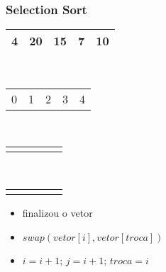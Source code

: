 \documentclass{beamer}
\begin{document}
\begin{frame}
    \frametitle{Selection Sort}
    \begin{center}
        \begin{table}
            \begin{tabular}{| p{0.25cm} | p{0.25cm} | p{0.25cm} | p{0.25cm} | p{0.25cm} |}
                \hline
                4 & 20 & 15 & 7 & 10 \\ \hline
            \end{tabular} \\
            \begin{tabular}{p{0.25cm} p{0.25cm} p{0.25cm} p{0.25cm} p{0.25cm}}
                0 & 1 & 2 & 3 & 4
            \end{tabular} \\
            \begin{tabular}{p{0.25cm} p{0.25cm} p{0.25cm} p{0.25cm} p{0.25cm}}
                 & \color{blue}{$\uparrow$} & & & \color{red}{$\uparrow$}
            \end{tabular} \\
            \begin{tabular}{p{0.25cm} p{0.25cm} p{0.25cm} p{0.25cm} p{0.25cm}}
                 & \color{blue}{i} & & & \color{red}{j}
            \end{tabular}
        \end{table}
	\end{center}
    \color{green}{$troca = 3$}
    \begin{itemize}[<+->]
        \item finalizou o vetor
        \item $swap(vetor[i], vetor[troca])$
        \item $i = i + 1$; $j = i + 1$; $troca = i$
    \end{itemize}
\end{frame}
\end{document}
